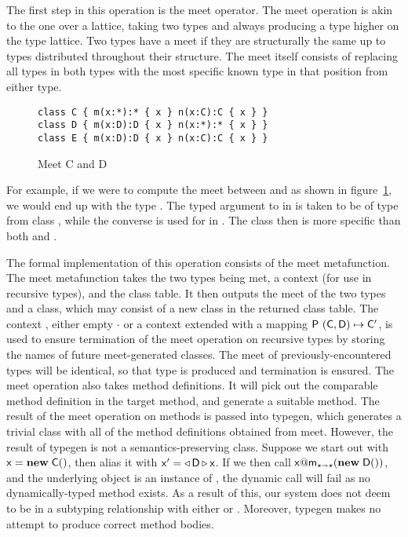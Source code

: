 \documentclass[sigconf]{acmart}
\begin{document}
The first step in this operation is the meet operator. The meet operation is
akin to the one over a lattice, taking two types and always producing a type
higher on the type lattice. Two types have a meet if they are structurally
the same up to \any types distributed throughout their structure. The meet
itself consists of replacing all \any types in both types with the most
specific known type in that position from either type.

\begin{figure}[h]
\begin{lstlisting}
class C { m(x:*):* { x } n(x:C):C { x } }
class D { m(x:D):D { x } n(x:*):* { x } }
class E { m(x:D):D { x } n(x:C):C { x } }
\end{lstlisting}
\caption{Meet C and D}
\label{fig:meetex}
\end{figure}

\noindent
For example, if we were to compute the meet between \C and \D as  shown in
figure~\ref{fig:meetex}, we would end up with the type . The \any typed
argument to \m in \C is taken to be of type \D from class \D, while the
converse is used for \n in \D. The class  then is more specific than
both \C and \D.

The formal implementation of this operation consists of the meet
metafunction. The meet metafunction takes the two types being met, a context
(for use in recursive types), and the class table. It then outputs the meet
of the two types and a class, which may consist of a new class in the
returned class table. The context , either empty $\cdot$ or a context
extended with a mapping $\P ~{{(\C,\D)}\mapsto\Cp}$, is used to ensure
termination of the meet operation on recursive types by storing the names of
future meet-generated classes. The meet of previously-encountered types will
be identical, so that type is produced and termination is ensured. The meet
operation also takes method definitions. It will pick out the comparable
method definition in the target method, and generate a suitable method.  The
result of the meet operation on methods is passed into typegen, which
generates a trivial class with all of the method definitions obtained from
meet. However, the result of typegen is not a semantics-preserving
class. Suppose we start out with $\x = \New\C{}$, then alias it with $\xp =
\MonCast\D\x$. If we then call $\DynCall\x\m{\New\D{}}$, and the underlying
object is an instance of , the dynamic call will fail as no
dynamically-typed method exists. As a result of this, our system does not
deem  to be in a subtyping relationship with either \C or
\D. Moreover, typegen makes no attempt to produce correct method bodies.
\end{document}
